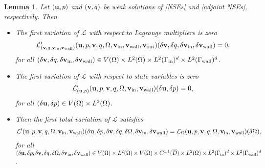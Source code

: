 \documentclass[oneside,11pt]{book}
\numberwithin{equation}{section}
\newtheorem{lemma}{Lemma}[section]
\begin{document}
\begin{lemma}
    Let $({\bf u},p)$ and $({\bf v},q)$ be weak solutions of \eqref{NSEs} and \eqref{adjoint NSEs}, respectively. Then
    \begin{itemize}
        \item[(i)] The first variation of $\mathcal{L}$ with respect to Lagrange multipliers is zero
        \begin{align}
            \mathcal{L}_{({\bf v},q,{\bf v}_{\rm in},{\bf v}_{\rm wall})}'({\bf u},p,{\bf v},q,\Omega,{\bf v}_{\rm in},{\bf v}_{\rm wall},{\bf v}_{\rm out})(\delta{\bf v},\delta q,\delta{\bf v}_{\rm in},\delta{\bf v}_{\rm wall}) = 0,
        \end{align}
        for all $(\delta{\bf v},\delta q,\delta{\bf v}_{\rm in},\delta{\bf v}_{\rm wall})\in V(\Omega)\times L^2(\Omega)\times L^2(\Gamma_{\rm in})^d\times L^2(\Gamma_{\rm wall})^d$.
        \item[(ii)] The first variation of $\mathcal{L}$ with respect to state variables is zero
        \begin{align}
            \mathcal{L}_{({\bf u},p)}'({\bf u},p,{\bf v},q,\Omega,{\bf v}_{\rm in},{\bf v}_{\rm wall})(\delta{\bf u},\delta p) = 0,
        \end{align}
        for all $(\delta{\bf u},\delta p)\in V(\Omega)\times L^2(\Omega)$.
        \item[(iii)] Then the first total variation of $\mathcal{L}$ satisfies
        \begin{align}
            \mathcal{L}'({\bf u},p,{\bf v},q,\Omega,{\bf v}_{\rm in},{\bf v}_{\rm wall})(\delta{\bf u},\delta p,\delta{\bf v},\delta q,\delta\Omega,\delta{\bf v}_{\rm in},\delta{\bf v}_{\rm wall}) = \mathcal{L}_{\Omega}({\bf u},p,{\bf v},q,\Omega,{\bf v}_{\rm in},{\bf v}_{\rm wall})(\delta\Omega),
        \end{align}
        for all $(\delta{\bf u},\delta p,\delta{\bf v},\delta q,\delta\Omega,\delta{\bf v}_{\rm in},\delta{\bf v}_{\rm wall})\in V(\Omega)\times L^2(\Omega)\times V(\Omega)\times C^{1,1}(\overline{D})\times L^2(\Omega)\times L^2(\Gamma_{\rm in})^d\times L^2(\Gamma_{\rm wall})^d$.
    \end{itemize}
\end{lemma}
\end{document}
